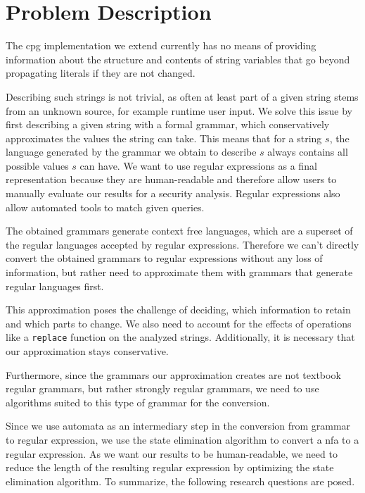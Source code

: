 \chapter{Problem Description}
\label{chapter:ProblemDescription}

The \ac{cpg} implementation we extend currently has no means of providing information about the structure and contents of string variables that go beyond propagating literals if they are not changed.

Describing such strings is not trivial, as often at least part of a given string stems from an unknown source, for example runtime user input.
We solve this issue by first describing a given string with a formal grammar, which conservatively approximates the values the string can take.
This means that for a string $s$, the language generated by the grammar we obtain to describe $s$ always contains all possible values $s$ can have.
We want to use regular expressions as a final representation because they are human-readable and therefore allow users to manually evaluate our results for a security analysis. Regular expressions also allow automated tools to match given queries. 

The obtained grammars generate context free languages, which are a superset of the regular languages accepted by regular expressions. Therefore we can't directly convert the obtained grammars to regular expressions without any loss of information, but rather need to approximate them with grammars that generate regular languages first.

This approximation poses the challenge of deciding, which information to retain and which parts to change. We also need to account for the effects of operations like a \lstinline|replace| function on the analyzed strings. Additionally, it is necessary that our approximation stays conservative.

Furthermore, since the grammars our approximation creates are not textbook regular grammars, but rather strongly regular grammars, we need to use algorithms suited to this type of grammar for the conversion.

Since we use automata as an intermediary step in the conversion from grammar to regular expression, we use the state elimination algorithm \cite{brzozowksi_mccluskey} to convert a \ac{nfa} to a regular expression. As we want our results to be human-readable, we need to reduce the length of the resulting regular expression by optimizing the state elimination algorithm.
\clearpage
To summarize, the following research questions are posed.

